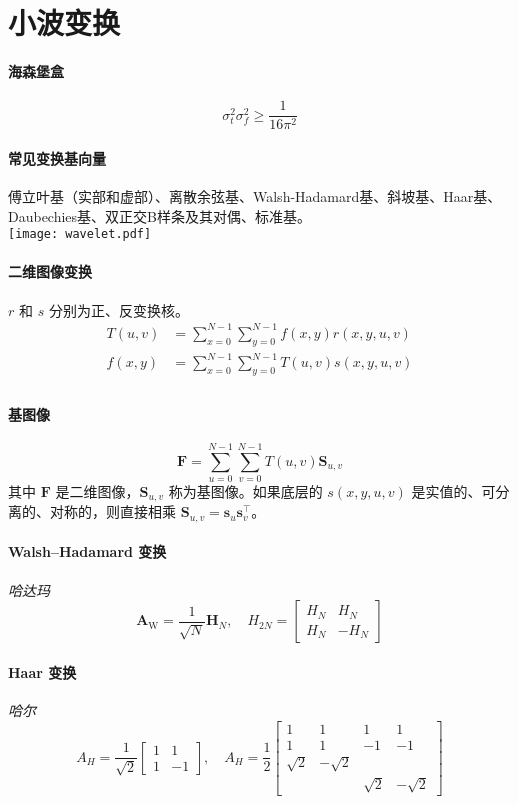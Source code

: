 \documentclass[twocolumn]{ctexart}
\begin{document}
\section{小波变换}
\paragraph{海森堡盒} $$\sigma_t^2\sigma_f^2\geq \frac{1}{16\pi^2}$$
\paragraph{常见变换基向量} 傅立叶基（实部和虚部）、离散余弦基、Walsh-Hadamard基、斜坡基、Haar基、Daubechies基、双正交B样条及其对偶、标准基。\\
\texttt{[image: wavelet.pdf]}
\paragraph{二维图像变换} $r$ 和 $s$ 分别为正、反变换核。
\begin{align*}
    T(u,v)&=\sum_{x=0}^{N-1}\sum_{y=0}^{N-1}f(x,y)r(x,y,u,v)\\
    f(x,y)&=\sum_{x=0}^{N-1}\sum_{y=0}^{N-1}T(u,v)s(x,y,u,v)\\
\end{align*}
\paragraph{基图像} $$\mathbf{F}=\sum_{u=0}^{N-1}\sum_{v=0}^{N-1}T(u,v)\mathbf{S}_{u,v}$$其中 $\mathbf{F}$ 是二维图像，$\mathbf{S}_{u,v}$ 称为基图像。如果底层的 $s(x,y,u,v)$ 是实值的、可分离的、对称的，则直接相乘 $\mathbf{S}_{u,v}=\mathbf{s}_u\mathbf{s}_v^\top$。
\paragraph{Walsh--Hadamard 变换} \emph{哈达玛}
$$\mathbf{A}_\text{W}=\frac{1}{\sqrt{N}}\mathbf{H}_N,\quad H_{2N}=\begin{bmatrix}
    H_N & H_N \\ H_N & -H_N
\end{bmatrix}$$
\paragraph{Haar 变换} \emph{哈尔}
$$A_H=\frac{1}{\sqrt{2}}\begin{bmatrix}
    1 & 1 \\ 1 & -1
\end{bmatrix},\quad A_H=\frac{1}{2}\begin{bmatrix}
    1 & 1 & 1 & 1 \\ 1 & 1 & -1 & -1 \\ \sqrt{2} & -\sqrt2 \\ & & \sqrt2 & -\sqrt2
\end{bmatrix}$$
\end{document}
